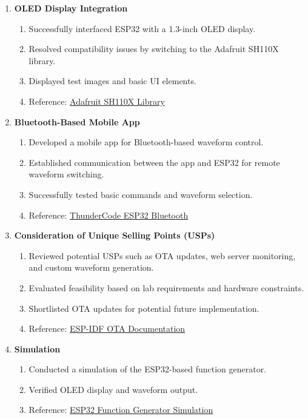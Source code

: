 \documentclass[12pt,a4paper]{article}
\begin{document}
\begin{enumerate}
    \item \textbf{OLED Display Integration}
    \begin{enumerate}
        \item Successfully interfaced ESP32 with a 1.3-inch OLED display.
        \item Resolved compatibility issues by switching to the Adafruit SH110X library.
        \item Displayed test images and basic UI elements.
        \item Reference: \href{https://github.com/adafruit/Adafruit_SH110X}{Adafruit SH110X Library}
    \end{enumerate}

    \item \textbf{Bluetooth-Based Mobile App}
    \begin{enumerate}
        \item Developed a mobile app for Bluetooth-based waveform control.
        \item Established communication between the app and ESP32 for remote waveform switching.
        \item Successfully tested basic commands and waveform selection.
        \item Reference: \href{https://github.com/ThunderCodeESP32/Bluetooth}{ThunderCode ESP32 Bluetooth}
    \end{enumerate}

    \item \textbf{Consideration of Unique Selling Points (USPs)}
    \begin{enumerate}
        \item Reviewed potential USPs such as OTA updates, web server monitoring, and custom waveform generation.
        \item Evaluated feasibility based on lab requirements and hardware constraints.
        \item Shortlisted OTA updates for potential future implementation.
        \item Reference: \href{https://docs.espressif.com/projects/esp-idf/en/latest/esp32/api-reference/system/ota.html}{ESP-IDF OTA Documentation}
    \end{enumerate}

    \item \textbf{Simulation}
    \begin{enumerate}
        \item Conducted a simulation of the ESP32-based function generator.
        \item Verified OLED display and waveform output.
        \item Reference: \href{https://wokwi.com/projects/421864820253254657}{ESP32 Function Generator Simulation}
    

\end{enumerate}
\end{enumerate}
\end{document}
